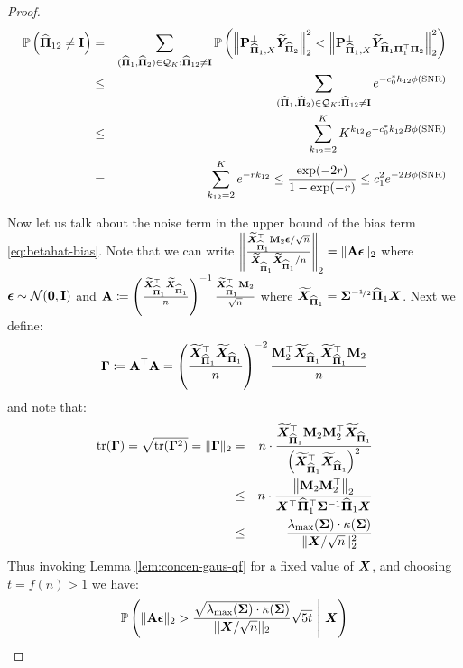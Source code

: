 \documentclass[numsec,webpdf,modern,medium,namedate]{oup-authoring-template}
\theoremstyle{thmstyleone}%
\theoremstyle{thmstyletwo}%
\theoremstyle{thmstylethree}%
\begin{document}
\begin{proof}
{\small
\begin{eqnarray*}
    \Prob\left(\hatPi_{12} \ne \bI\right) &=& \sum_{(\hatPi_1, \hatPi_2) \in \calQ_K:\hatPi_{12}\neq \bI} \Prob\left(\left\| \bP_{\hatPi_1, X}^\perp \tilY_{{\hatPi_2}}\right\|_2^2 
< \left\| \bP_{\hatPi_1, X}^\perp \tilY_{\hatPi_1 \bPi_1^\top \bPi_2} \right\|_2^2\right)\\
&\leq & \sum_{(\hatPi_1, \hatPi_2) \in \calQ_K:\hatPi_{12}\neq \bI} e^{-c_0^\ast h_{12}\phi( \snr)}\\
& \leq & \sum_{k_{12}=2}^K K^{k_{12}} e^{-c_0^\ast k_{12}B\phi(\snr)}\\
& = & \sum_{k_{12} = 2}^K e^{-rk_{12}}\leq \frac{\exp(-2r)}{1 - \exp(-r)} \leq  c_1 ^2 e^{-2B \phi(\snr)}
\end{eqnarray*}}

Now let us talk about the noise term in the upper bound of the bias term \eqref{eq:betahat-bias}. Note that we can write $\norm{\frac{\widetilde{\bX}_{\hatPi_1}^\top \bM_2 \beps/\sqrt{n}}{\widetilde{\bX}_{\hatPi_1}^\top  \widetilde{\bX}_{\hatPi_1}/n}}_2 = \|\bA\beps\|_2$ where $\beps \sim \calN(\bzero,\bI)$ and $\bA \coloneq \left(\frac{\widetilde{\bX}_{\hatPi_1}^\top  \widetilde{\bX}_{\hatPi_1}}{n}\right)^{-1}\frac{\widetilde{\bX}_{\hatPi_1}^\top \bM_2}{\sqrt{n}}$ where $\widetilde{\bX}_{\hatPi_1} = {\bSig}^{- \nicefrac{1}{2}}\hatPi_1 \bX$. Next we define:
\begin{eqnarray*}
    \bGam \coloneq \bA^\top\bA = \left(\frac{\widetilde{\bX}_{\hatPi_1}^\top  \widetilde{\bX}_{\hatPi_1}}{n}\right)^{-2}\dfrac{\bM_2^\top\widetilde{\bX}_{\hatPi_1}\widetilde{\bX}_{\hatPi_1}^\top \bM_2}{n}
\end{eqnarray*}
and note that: 
\begin{eqnarray*}
    \tr(\bGam) = \sqrt{\tr(\bGam^2)} = \|\bGam\|_2 & = & n\cdot \dfrac{\widetilde{\bX}_{\hatPi_1}^\top \bM_2\bM_2^\top\widetilde{\bX}_{\hatPi_1}}{\left(\widetilde{\bX}_{\hatPi_1}^\top  \widetilde{\bX}_{\hatPi_1}\right)^{2}}\\
    & \leq & n\cdot\dfrac{\left\|\bM_2\bM_2^\top\right\|_2}{\bX^\top\hatPi_1^\top\bSig^{-1}\hatPi_1\bX}\\
    & \leq & \dfrac{\lambda_{\max}(\bSig)\cdot\kappa(\bSig)}{\|\bX/\sqrt{n}\|^2_2}
\end{eqnarray*}
Thus invoking Lemma \ref{lem:concen-gaus-qf} for a fixed value of $\bX$, and choosing $t = f(n) > 1$ we have:
    {\footnotesize
    \begin{eqnarray*}
        \Prob\left(\|\bA\beps\|_2> \dfrac{\sqrt{\lambda_{\max}(\bSig)\cdot\kappa(\bSig)}}{||\bX/\sqrt{n}||_2}\sqrt{5t}\ \Bigg|\ \bX\right)

\end{eqnarray*}}
\end{proof}
\end{document}
